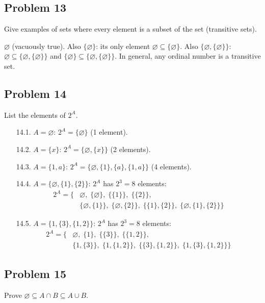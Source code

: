 \subsection*{Problem 13}
Give examples of sets where every element is a subset of the set (transitive sets).

$\varnothing$ (vacuously true). Also $\{\varnothing\}$: its only element $\varnothing \subseteq \{\varnothing\}$.
Also $\{\varnothing, \{\varnothing\}\}$: $\varnothing \subseteq \{\varnothing, \{\varnothing\}\}$ and $\{\varnothing\} \subseteq \{\varnothing, \{\varnothing\}\}$.
In general, any ordinal number is a transitive set.

\subsection*{Problem 14}
List the elements of $2^A$.

\begin{itemize}
  \item[14.1.] $A = \varnothing$: $\boxed{2^A = \{\varnothing\}}$ (1 element).
  \item[14.2.] $A = \{x\}$: $\boxed{2^A = \{\varnothing, \{x\}\}}$ (2 elements).
  \item[14.3.] $A = \{1,a\}$: $\boxed{2^A = \{\varnothing, \{1\}, \{a\}, \{1,a\}\}}$ (4 elements).
  \item[14.4.] $A = \{\varnothing, \{1\}, \{2\}\}$: $2^A$ has $2^3 = 8$ elements:
    \begin{align*}
      2^A = \bigl\{&\varnothing,\;\{\varnothing\},\;\{\{1\}\},\;\{\{2\}\},\\
      &\{\varnothing,\{1\}\},\;\{\varnothing,\{2\}\},\;\{\{1\},\{2\}\},\;\{\varnothing,\{1\},\{2\}\}\bigr\}
    \end{align*}
  \item[14.5.] $A = \{1, \{3\}, \{1,2\}\}$: $2^A$ has $2^3 = 8$ elements:
    \begin{align*}
      2^A = \bigl\{&\varnothing,\;\{1\},\;\{\{3\}\},\;\{\{1,2\}\},\\
      &\{1,\{3\}\},\;\{1,\{1,2\}\},\;\{\{3\},\{1,2\}\},\;\{1,\{3\},\{1,2\}\}\bigr\}
    \end{align*}
\end{itemize}

\subsection*{Problem 15}
Prove $\varnothing \subseteq A \cap B \subseteq A \cup B$.

